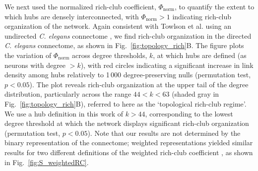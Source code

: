 \documentclass[10pt,letterpaper]{article}
\begin{document}
We next used the normalized rich-club coefficient, $\Phi_\mathrm{norm}$, to quantify the extent to which hubs are densely interconnected, with $\Phi_\mathrm{norm} > 1$ indicating rich-club organization of the network.
Again consistent with Towlson et al. using an undirected \emph{C. elegans} connectome \cite{Towlson:2013gf}, we find rich-club organization in the directed \emph{C. elegans} connectome, as shown in Fig.~\ref{fig:topology_rich}B.
The figure plots the variation of $\Phi_\mathrm{norm}$ across degree thresholds, $k$, at which hubs are defined (as neurons with degree $>k$), with red circles indicating a significant increase in link density among hubs relatively to 1\,000 degree-preserving nulls (permutation test, $p < 0.05$).
The plot reveals rich-club organization at the upper tail of the degree distribution, particularly across the range $44 < k < 63$ (shaded gray in Fig.~\ref{fig:topology_rich}B), referred to here as the `topological rich-club regime'.
We use a hub definition in this work of $k > 44$, corresponding to the lowest degree threshold at which the network displays significant rich-club organization (permutation test, $p < 0.05$).
Note that our results are not determined by the binary representation of the connectome; weighted representations yielded similar results for two different definitions of the weighted rich-club coefficient \cite{Opsahl2008}, as shown in Fig.~\ref{fig:S_weightedRC}.
\end{document}
